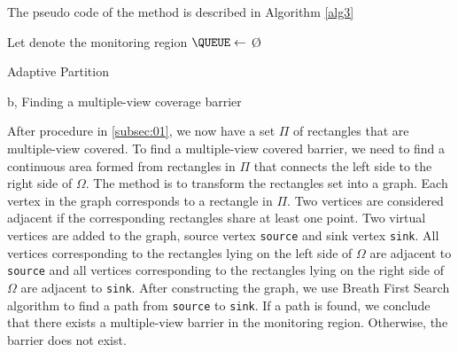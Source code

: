 The pseudo code of the method is described in Algorithm \ref{alg3}
%

%
\begin{center}
	\begin{minipage}{.7\linewidth}
		\begin{algorithm}[H]
			\DontPrintSemicolon
			\SetAlgoLined
			\newcommand{\forcondi}[2]{\ensuremath{#1 \in #2}}
			\BlankLine
			\BlankLine
			\BlankLine
			Let \root denote the monitoring region\;
			$\QUEUE\gets$ \O \;
			\enqueue{\root, \QUEUE} \;
			\caption{Adaptive Partition}
			\label{alg3}
		\end{algorithm}
	\end{minipage}
\end{center}

b, Finding a multiple-view coverage barrier

After procedure in \ref{subsec:01}, we now have a set $\Pi$ of rectangles that are multiple-view covered. To find a multiple-view covered barrier, we need to find a continuous area formed from rectangles in $\Pi$ that connects the left side to the right side of $\Omega$. The method is to transform the rectangles set into a graph. Each vertex in the graph corresponds to a rectangle in $\Pi$. Two vertices are considered adjacent if the corresponding rectangles share at least one point. Two virtual vertices are added to the graph, source vertex {\tt source} and sink vertex {\tt sink}. All vertices corresponding to the rectangles lying on the left side of $\Omega$ are adjacent to {\tt source} and all vertices corresponding to the rectangles lying on the right side of $\Omega$ are adjacent to {\tt sink}. After constructing the graph, we use Breath First Search algorithm to find a path from {\tt source} to {\tt sink}. If a path is found, we conclude that there exists a multiple-view barrier in the monitoring region. Otherwise, the barrier does not exist.